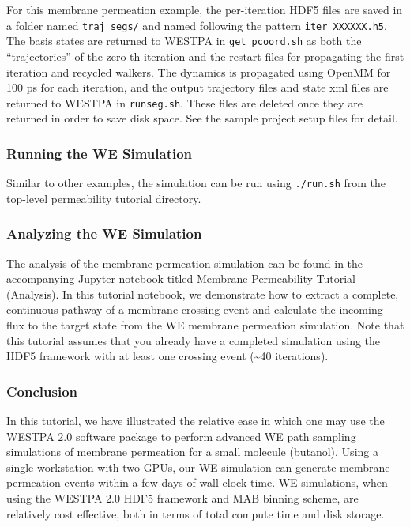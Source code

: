For this membrane permeation example, the per-iteration HDF5 files are saved in a folder named \verb|traj_segs/| and named following the pattern \verb|iter_XXXXXX.h5|. 
The basis states are returned to WESTPA in \verb|get_pcoord.sh| as both the “trajectories” of the zero-th iteration and the restart files for propagating the first iteration and recycled walkers. 
The dynamics is propagated using OpenMM for 100 ps for each iteration, and the output trajectory files and state xml files are returned to WESTPA in \verb|runseg.sh|. 
These files are deleted once they are returned in order to save disk space. 
See the sample project setup files for detail.

\subsubsection{Running the WE Simulation}
Similar to other examples, the simulation can be run using \verb|./run.sh| from the top-level permeability tutorial directory.

\subsubsection{Analyzing the WE Simulation}
The analysis of the membrane permeation simulation can be found in the accompanying Jupyter notebook titled Membrane Permeability Tutorial (Analysis). 
In this tutorial notebook, we demonstrate how to extract a complete, continuous pathway of a membrane-crossing event and calculate the incoming flux to the target state from the WE membrane permeation simulation. 
Note that this tutorial assumes that you already have a completed simulation using the HDF5 framework with at least one crossing event (\textasciitilde40 iterations).

\subsubsection{Conclusion}
In this tutorial, we have illustrated the relative ease in which one may use the WESTPA 2.0 software package to perform advanced WE path sampling simulations of membrane permeation for a small molecule (butanol). 
Using a single workstation with two GPUs, our WE simulation can generate membrane permeation events within a few days of wall-clock time. 
WE simulations, when using the WESTPA 2.0 HDF5 framework and MAB binning scheme, are relatively cost effective, both in terms of total compute time and disk storage.